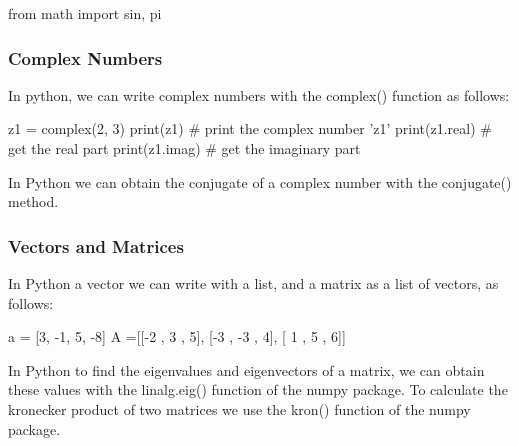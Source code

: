 \begin{code}
from math import sin, pi
\end{code}

\subsubsection*{Complex Numbers}

In python, we can write complex numbers with the complex() function as follows:
\begin{code}
z1 = complex(2, 3)
print(z1)         # print the complex number 'z1'
print(z1.real)    # get the real part
print(z1.imag)    # get the imaginary part
\end{code}

In Python we can obtain the conjugate of a complex number with the conjugate() method.

\subsubsection*{Vectors and Matrices}

In Python a vector we can write with a list, and a matrix as a list of vectors, as follows:

\begin{code}
a = [3, -1, 5, -8]
A =[[-2 ,  3 , 5],
    [-3 , -3 , 4],
    [ 1 ,  5 , 6]]
\end{code}

In Python to find the eigenvalues and eigenvectors of a matrix, we can obtain these values with the linalg.eig() function of the numpy package.
To calculate the kronecker product of two matrices we use the kron() function of the numpy package.